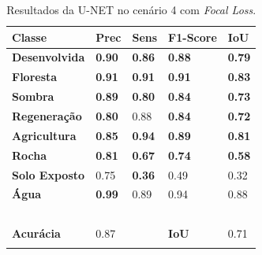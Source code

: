 \documentclass[%
  10pt,%
  aspectratio = 169,%
  compress,%
  t,%
  english,%
  brazilian,%
  tikz,
]{beamer}
\begin{document}
\begin{frame}
\begin{columns}[T]
\begin{table}[!ht]
    \centering
    \caption{Resultados da U-NET no cenário 4 com \textit{Focal Loss}.}%
    \label{tab:res:cen42}%
    \begin{tabular}{lllll}
    \toprule
        \textbf{Classe} & \textbf{Prec} & \textbf{Sens} & \textbf{F1-Score} & \textbf{IoU} \\
        \midrule
        \textbf{Desenvolvida}    & \textbf{0.90} & \textbf{0.86} & \textbf{0.88} & \textbf{0.79}  \\ 
        \textbf{Floresta}        & \textbf{0.91} & \textbf{0.91} & \textbf{0.91} & \textbf{0.83}  \\ 
        \textbf{Sombra}          & \textbf{0.89} & \textbf{0.80} & \textbf{0.84} & \textbf{0.73}  \\ 
        \textbf{Regeneração}     & \textbf{0.80} & 0.88 & \textbf{0.84} & \textbf{0.72}  \\ 
        \textbf{Agricultura}     & \textbf{0.85} & \textbf{0.94} & \textbf{0.89} & \textbf{0.81}  \\ 
        \textbf{Rocha}           & \textbf{0.81} & \textbf{0.67} & \textbf{0.74} & \textbf{0.58}  \\ 
        \textbf{Solo Exposto}    & \colorbox{green!25}{0.75} & \textbf{0.36} & \colorbox{green!25}{0.49} & \colorbox{green!25}{0.32}  \\ 
        \textbf{Água}            & \textbf{0.99} & \colorbox{green!25}{0.89} & \colorbox{green!25}{0.94} & \colorbox{green!25}{0.88}  \\ 
        \textbf{} & ~ & ~ & ~ & ~ \\ 
        \textbf{Acurácia} & \colorbox{green!25}{0.87} & ~ & \textbf{IoU} & \colorbox{green!25}{0.71} \\
        \bottomrule
        \addlinespace
    \end{tabular}
\end{table}

\end{columns}
\end{frame}
\end{document}
